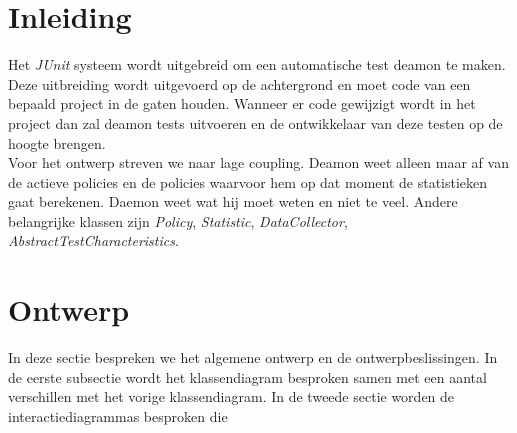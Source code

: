 \documentclass[i1]{oss}
\begin{document}

\maketitlepage
\newpage
\tableofcontents
\pagebreak




\section*{Inleiding}
\label{ssec:Inleiding}

Het \emph{JUnit} systeem wordt uitgebreid om een automatische test deamon te maken. Deze uitbreiding wordt uitgevoerd op de achtergrond en moet code van een bepaald project in de gaten houden. Wanneer er code gewijzigt wordt in het project dan zal deamon tests uitvoeren en de ontwikkelaar van deze testen op de hoogte brengen.\\


Voor het ontwerp streven we naar lage coupling. Deamon weet alleen maar af van de actieve policies en de policies waarvoor hem op dat moment de statistieken gaat berekenen. Daemon weet wat hij moet weten en niet te veel. Andere belangrijke klassen zijn \textit{Policy}, \textit{Statistic}, \textit{DataCollector}, \textit{AbstractTestCharacteristics}.


\section{Ontwerp}
\label{ssec:Ontwerp}

In deze sectie bespreken we het algemene ontwerp en de ontwerpbeslissingen. In de eerste subsectie wordt het klassendiagram besproken samen met een aantal verschillen met het vorige klassendiagram.
In de tweede sectie worden de interactiediagrammas besproken die 
\end{document}
